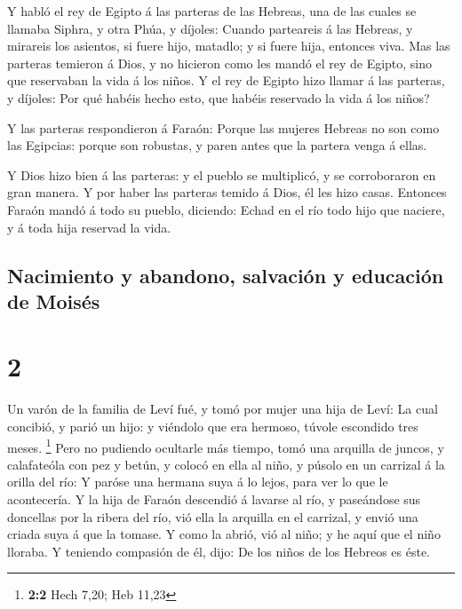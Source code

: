  Y habló el rey de Egipto á las parteras de las Hebreas,
una de las cuales se llamaba Siphra, y otra Phúa, y díjoles:
 Cuando parteareis á las Hebreas, y mirareis los asientos,
si fuere hijo, matadlo; y si fuere hija, entonces viva. 
Mas las parteras temieron á Dios, y no hicieron como les mandó el rey de
Egipto, sino que reservaban la vida á los niños.  Y el rey
de Egipto hizo llamar á las parteras, y díjoles: Por qué habéis hecho
esto, que habéis reservado la vida á los niños?

 Y las parteras respondieron á Faraón: Porque las mujeres
Hebreas no son como las Egipcias: porque son robustas, y paren antes que
la partera venga á ellas.

 Y Dios hizo bien á las parteras: y el pueblo se
multiplicó, y se corroboraron en gran manera.  Y por haber
las parteras temido á Dios, él les hizo casas.  Entonces
Faraón mandó á todo su pueblo, diciendo: Echad en el río todo hijo que
naciere, y á toda hija reservad la vida.

\hypertarget{nacimiento-y-abandono-salvaciuxf3n-y-educaciuxf3n-de-moisuxe9s}{%
\subsection{Nacimiento y abandono, salvación y educación de
Moisés}\label{nacimiento-y-abandono-salvaciuxf3n-y-educaciuxf3n-de-moisuxe9s}}

\hypertarget{section-1}{%
\section{2}\label{section-1}}

 Un varón de la familia de Leví fué, y tomó por mujer una
hija de Leví:  La cual concibió, y parió un hijo: y viéndolo
que era hermoso, túvole escondido tres meses. \footnote{\textbf{2:2}
  Hech 7,20; Heb 11,23}  Pero no pudiendo ocultarle más
tiempo, tomó una arquilla de juncos, y calafateóla con pez y betún, y
colocó en ella al niño, y púsolo en un carrizal á la orilla del río:
 Y paróse una hermana suya á lo lejos, para ver lo que le
acontecería.  Y la hija de Faraón descendió á lavarse al
río, y paseándose sus doncellas por la ribera del río, vió ella la
arquilla en el carrizal, y envió una criada suya á que la tomase.
 Y como la abrió, vió al niño; y he aquí que el niño
lloraba. Y teniendo compasión de él, dijo: De los niños de los Hebreos
es éste.


